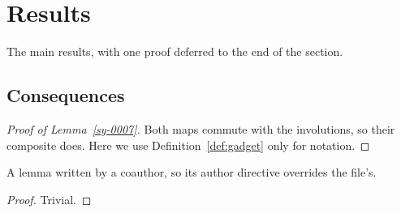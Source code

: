 \section{Results}\label{sy-0200}

The main results, with one proof deferred to the end of the section.



\subsection{Consequences}\label{sy-0201}







\begin{proof}[Proof of Lemma~\ref{sy-0007}]
Both maps commute with the involutions, so their composite does. Here we use Definition~\ref{def:gadget} only for notation.
\end{proof}

\begin{lemma}\label{sy-0202}
A lemma written by a coauthor, so its author directive overrides the file's.
\end{lemma}
\begin{proof}
Trivial.
\end{proof}

